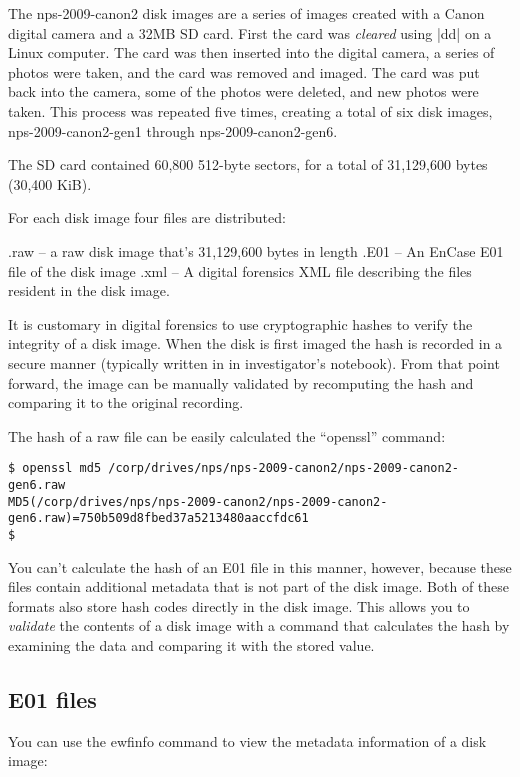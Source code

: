 The nps-2009-canon2 disk images are a series of images created with a
Canon digital camera and a 32MB SD card. First the card was
\emph{cleared} using |dd| on a Linux computer. The card was then
inserted into the digital camera, a series of photos were taken, and
the card was removed and imaged. The card was put back into the
camera, some of the photos were deleted, and new photos were
taken. This process was repeated five times, creating a total of six
disk images, nps-2009-canon2-gen1 through nps-2009-canon2-gen6.

The SD card contained 60,800 512-byte sectors, for a total of
31,129,600 bytes (30,400 KiB).

For each disk image four files are distributed:

   .raw -- a raw disk image that's 31,129,600 bytes in length
   .E01 -- An EnCase E01 file of the disk image
   .xml -- A digital forensics XML file describing the files resident
           in the disk image.


It is customary in digital forensics to use cryptographic hashes to
verify the integrity of a disk image. When the disk is first imaged
the hash is recorded in a secure manner (typically written in in
investigator's notebook). From that point forward, the image can be
manually validated by recomputing the hash and comparing it to the
original recording.

The hash of a raw file can be easily calculated the ``openssl''
command:

\begin{Verbatim}
$ openssl md5 /corp/drives/nps/nps-2009-canon2/nps-2009-canon2-gen6.raw
MD5(/corp/drives/nps/nps-2009-canon2/nps-2009-canon2-gen6.raw)=750b509d8fbed37a5213480aaccfdc61
$ 
\end{Verbatim}

You can't calculate the hash of an E01 file in this manner,
however, because these files contain additional metadata that is not
part of the disk image.  Both of these formats also store hash codes
directly in the disk image. This allows you to \emph{validate} the
contents of a disk image with a command that calculates the hash by
examining the data and comparing it with the stored value. 

\subsection{E01 files}
You can use the ewfinfo command to view the metadata information of a
disk image:


